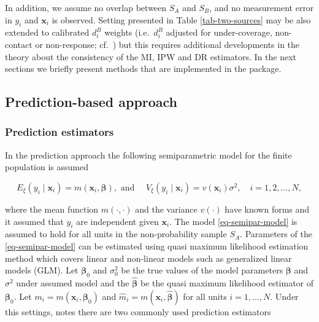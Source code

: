 \documentclass[
]{jss}
\begin{document}
In addition, we assume no overlap between \(S_A\) and \(S_B\), and no
measurement error in \(y_i\) and \(\boldsymbol{x}_i\) is observed.
Setting presented in Table \ref{tab-two-sources} may be also extended to
calibrated \(d_i^B\) weights (i.e.~\(d_i^B\) adjusted for
under-coverage, non-contact or non-response;
cf.~\cite{sarndal2005estimation}) but this requires additional
developments in the theory about the consistency of the MI, IPW and DR
estimators. In the next sections we briefly present methods that are
implemented in the package.

\subsection{Prediction-based approach}\label{sec-prediction}

\subsubsection{Prediction estimators}\label{prediction-estimators}

In the prediction approach the following semiparametric model for the
finite population is assumed

\begin{equation}
E_{\xi}\left(y_i \mid \boldsymbol{x}_i\right)=m\left(\boldsymbol{x}_i, \boldsymbol{\beta}\right), \text { and } \quad V_{\xi}\left(y_i \mid \boldsymbol{x}_i\right)=v\left(\boldsymbol{x}_i\right) \sigma^2, \quad i=1,2, \ldots, N,
\label{eq-semipar-model}
\end{equation}

where the mean function \(m(\cdot,\cdot)\) and the variance \(v(\cdot)\)
have known forms and it assumed that \(y_i\) are independent given
\(\boldsymbol{x}_i\). The model \eqref{eq-semipar-model} is assumed to
hold for all units in the non-probability sample \(S_A\). Parameters of
the \eqref{eq-semipar-model} can be estimated using quasi maximum
likelihood estimation method which covers linear and non-linear models
such as generalized linear models (GLM). Let \(\boldsymbol{\beta}_0\)
and \(\sigma^2_0\) be the true values of the model parameters
\(\boldsymbol{\beta}\) and \(\sigma^2\) under assumed model and the
\(\hat{\boldsymbol{\beta}}\) be the quasi maximum likelihood estimator
of \(\boldsymbol{\beta}_0\). Let
\(m_i=m(\boldsymbol{x}_i, \boldsymbol{\beta}_0)\) and
\(\hat{m}_i=m(\boldsymbol{x}_i, \hat{\boldsymbol{\beta}})\) for all
units \(i=1,...,N\). Under this settings, \citet{wu2022statistical}
notes there are two commonly used prediction estimators
\end{document}
